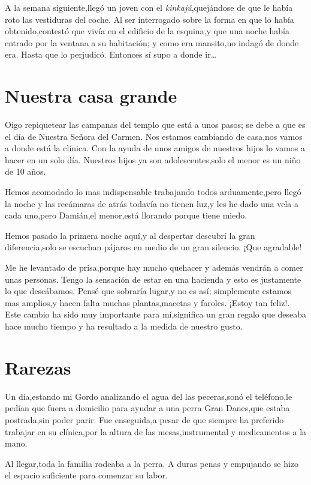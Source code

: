 \documentclass[letterpaper,12pt]{book}
\begin{document}
A la semana siguiente,llegó un joven con el {\it kinkajú},quejándose de que le había roto las vestiduras del coche. Al ser interrogado sobre la forma en que lo había obtenido,contestó que vivía en el edificio de la esquina,y que una noche había entrado por la ventana a su habitación; y como era mansito,no indagó de donde era. Hasta que lo perjudicó. Entonces sí supo a donde ir\ldots

\chapter{Nuestra casa grande}
Oigo repiquetear las campanas del templo que está a unos pasos; se debe a que es el día de Nuestra Señora del Carmen. Nos estamos cambiando de casa,nos vamos a donde está la clínica. Con la ayuda de unos amigos de nuestros hijos lo vamos a hacer en un solo día. Nuestros hijos ya son adolescentes,solo el menor es un niño de 10 años. 

Hemos acomodado lo mas indispensable trabajando todos arduamente,pero llegó la noche y las recámaras de atrás todavía no tienen luz,y les he dado una vela a cada uno,pero Damián,el menor,está llorando porque tiene miedo.

Hemos pasado la primera noche aquí,y al despertar descubrí la gran diferencia,solo se escuchan pájaros en medio de un gran silencio. ¡Que agradable!

Me he levantado de prisa,porque hay mucho quehacer y además vendrán a comer unas personas. Tengo la sensación de estar en una hacienda y esto es justamente lo que deseábamos. Pensé que sobraría lugar,y no es así; simplemente estamos mas amplios,y hacen falta muchas plantas,macetas y faroles. ¡Estoy tan feliz!. Este cambio ha sido muy importante para mí,significa un gran regalo que deseaba hace mucho tiempo y ha resultado a la medida de nuestro gusto.

\chapter{Rarezas}
Un día,estando mi Gordo analizando el agua del las peceras,sonó el teléfono,le pedían que fuera a domicilio para ayudar a una perra Gran Danes,que estaba postrada,sin poder parir. Fue enseguida,a pesar de que siempre ha preferido trabajar en su clínica,por la altura de las mesas,instrumental y medicamentos a la mano.

Al llegar,toda la familia rodeaba a la perra. A duras penas y empujando se hizo el espacio suficiente para comenzar su labor.
\end{document}
